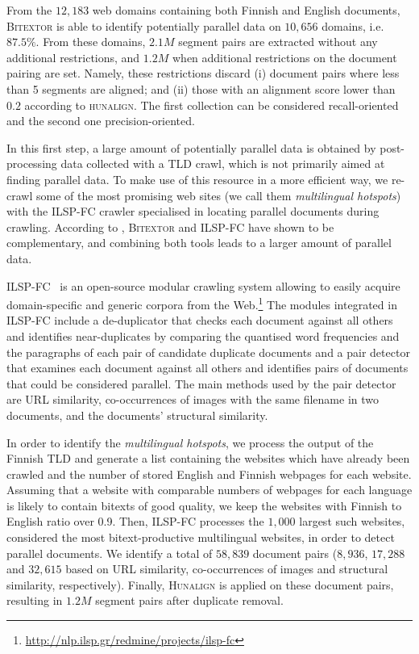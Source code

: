 \documentclass[postprint]{flammie}
\begin{document}
From the $12,183$ web domains containing both Finnish and English documents, \textsc{Bitextor} is able to identify potentially parallel data on $10,656$ domains, i.e. $87.5\%$. From these domains, $2.1M$ %
segment pairs are extracted without any additional restrictions, and $1.2M$ %
when additional restrictions on the document pairing are set. Namely, these restrictions discard (i) document pairs where less than 5 segments are aligned; and (ii) those with an alignment score lower than $0.2$ according to \textsc{hunalign}. The first collection can be considered recall-oriented and the second one precision-oriented.
%

In this first step, a large amount of potentially parallel data is obtained by post-processing data collected with a TLD crawl, which is not primarily aimed at finding parallel data. To make use of this resource in a more efficient way, we re-crawl some of the most promising web sites (we call them \textit{multilingual hotspots}) with the \textsc{ILSP-FC} crawler specialised in locating parallel documents during crawling. According to \cite{espla14-comparing}, \textsc{Bitextor} and \textsc{ILSP-FC} have shown to be complementary, and combining both tools leads to a larger amount of parallel data.
%

\textsc{ILSP-FC}~\cite{papavassiliou-prokopidis-thurmair:2013:BUCC} is an open-source modular crawling system allowing to easily acquire domain-specific and generic corpora from the Web.\footnote{\url{http://nlp.ilsp.gr/redmine/projects/ilsp-fc}}
The modules integrated in \textsc{ILSP-FC} include a de-duplicator that checks each document against all others and identifies near-duplicates by comparing the quantised word frequencies and the paragraphs of each pair of candidate duplicate documents and a pair detector that examines each document against all others and identifies pairs of documents that could be considered parallel. The main methods used by the pair detector are URL similarity, co-occurrences of images with the same filename in two documents, and the documents' structural similarity.
%

In order to identify the \textit{multilingual hotspots}, we process the output of the Finnish TLD and generate a list containing the websites which have already been crawled and the number of stored English and Finnish webpages for each website. Assuming that a website with comparable numbers of webpages for each language is likely to contain bitexts of good quality, we keep the websites with Finnish to English ratio over 0.9. Then, \textsc{ILSP-FC} processes the $1,000$ largest such websites, considered the most bitext-productive multilingual websites, in order to detect parallel documents. We identify a total of $58,839$ document pairs ($8,936$, $17,288$ and $32,615$ based on URL similarity, co-occurrences of images and structural similarity, respectively). Finally, \textsc{Hunalign} is applied on these document pairs, resulting in $1.2M$ %
segment pairs after duplicate removal.
\end{document}
